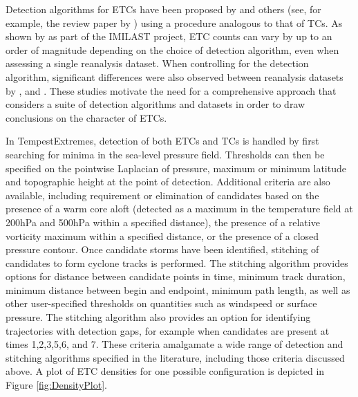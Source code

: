\documentclass[11pt]{article}
\begin{document}
Detection algorithms for ETCs have been proposed by \cite{wang2006climatology, wernli2006surface, raible2008northern} and others (see, for example, the review paper by \cite{ulbrich2009extra}) using a procedure analogous to that of TCs.  As shown by \cite{neu2013imilast} as part of the IMILAST project, ETC counts can vary by up to an order of magnitude depending on the choice of detection algorithm, even when {\color{blue}assessing} a single reanalysis dataset.  When controlling for the detection algorithm, significant differences were also observed between reanalysis datasets by \cite{hodges2003comparison}, \cite{wang2006climatology} and \cite{raible2008northern}.  These studies motivate the need for a comprehensive approach that considers a suite of detection algorithms and datasets in order to draw conclusions on the character of ETCs.

In TempestExtremes, detection of both ETCs and TCs is handled by first searching for minima in the sea-level pressure field.  Thresholds can then be specified on the pointwise Laplacian of pressure, maximum or minimum latitude and topographic height at the point of detection.  Additional criteria are also available, including requirement or elimination of candidates based on the presence of a warm core aloft (detected as a maximum in the temperature field at 200hPa and 500hPa within a specified distance), the presence of a relative vorticity maximum within a specified distance, or the presence of a closed pressure contour.  Once candidate storms have been identified, stitching of candidates to form cyclone tracks is performed.  The stitching algorithm provides options for distance between candidate points in time, minimum track duration, minimum distance between begin and endpoint, minimum path length, as well as other user-specified thresholds on quantities such as windspeed or surface pressure.  The stitching algorithm also provides an option for identifying trajectories with detection gaps, for example when candidates are present at times 1,2,3,5,6, and 7.  These criteria amalgamate a wide range of detection and stitching algorithms specified in the literature, including those criteria discussed above.  A plot of ETC densities for one possible configuration is depicted in Figure \ref{fig:DensityPlot}.
\end{document}
